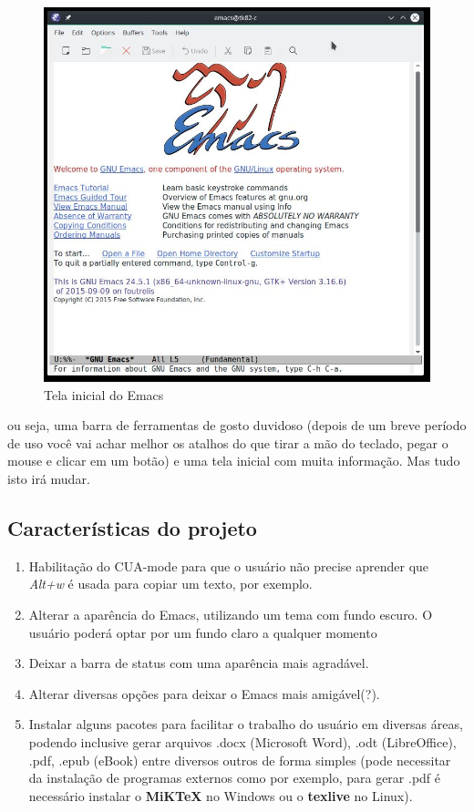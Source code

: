\documentclass[]{article}
\providecommand{\tightlist}{%
  \setlength{\itemsep}{0pt}\setlength{\parskip}{0pt}}
\begin{document}
\begin{figure}[htbp]
\centering
\includegraphics{./images/emacs1.jpg}
\caption{Tela inicial do Emacs}
\end{figure}

ou seja, uma barra de ferramentas de gosto duvidoso (depois de um breve
período de uso você vai achar melhor os atalhos do que tirar a mão do
teclado, pegar o mouse e clicar em um botão) e uma tela inicial com
muita informação. Mas tudo isto irá mudar.

\subsection{Características do
projeto}\label{caracteruxedsticas-do-projeto}

\begin{enumerate}
\tightlist
\item
  Habilitação do CUA-mode para que o usuário não precise aprender que
  \emph{Alt+w} é usada para copiar um texto, por exemplo.
\item
  Alterar a aparência do Emacs, utilizando um tema com fundo escuro. O
  usuário poderá optar por um fundo claro a qualquer momento
\item
  Deixar a barra de status com uma aparência mais agradável.
\item
  Alterar diversas opções para deixar o Emacs mais amigável(?).
\item
  Instalar alguns pacotes para facilitar o trabalho do usuário em
  diversas áreas, podendo inclusive gerar arquivos .docx (Microsoft
  Word), .odt (LibreOffice), .pdf, .epub (eBook) entre diversos outros
  de forma simples (pode necessitar da instalação de programas externos
  como por exemplo, para gerar .pdf é necessário instalar o
  \textbf{MiKTeX} no Windows ou o \textbf{texlive} no Linux).
\end{enumerate}
\end{document}
